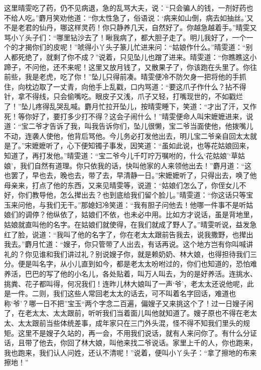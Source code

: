 \documentclass[12pt,oneside]{book}
\begin{document}
这里晴雯吃了药，仍不见病退，急的乱骂大夫，说：“只会骗人的钱，一剂好药也不给人吃。”麝月笑劝他道：“你太性急了，俗语说：‘病来如山倒，病去如抽丝。’又不是老君的仙丹，哪这样灵药！你只静养几天，自然好了。你越急越着手。”晴雯又骂小丫头子们：“哪里钻沙去了！瞅我病了，都大胆子走了。明儿我好了，一个一个的才揭你们的皮呢！”唬得小丫头子篆儿忙进来问：“姑娘作什么。”晴雯道：“别人都死绝了，就剩了你不成？”说着，只见坠儿也蹭了进来。晴雯道：“你瞧瞧这小蹄子，不问他，还不来呢！这里又放月钱了，又散果子了，你该跑在头里了。你往前些，我是老虎，吃了你！”坠儿只得前凑。晴雯便冷不防欠身一把将他的手抓住，向枕边取了一丈青，向他手上乱戳，口内骂道：“要这爪子作什么？拈不得针，拿不得线，只会偷嘴吃。眼皮子又浅，爪子又轻，打嘴现世的，不如戳烂了！”坠儿疼得乱哭乱喊。麝月忙拉开坠儿，按晴雯睡下，笑道：“才出了汗，又作死！等你好了，要打多少打不得？这会子闹什么！”晴雯便命人叫宋嬷嬷进来，说道：“宝二爷才告诉了我，叫我告诉你们，坠儿很懒，宝二爷当面使他，他拨嘴儿不动，连袭人使他，他背后骂他。今儿务必打发他出去，明儿宝二爷亲自回太太就是了。”宋嬷嬷听了，心下便知镯子事发，因笑道：“虽如此说，也等花姑娘回来，知道了，再打发他。”晴雯道：“宝二爷今儿千叮咛万嘱咐的，什么‘花姑娘’‘草姑娘’，我们自然有道理。你只依我的话，快叫他家的人来领他出去！”麝月道：“这也罢了，早也去，晚也去，带了去，早清静一日。”宋嬷嬷听了，只得出去，唤了他母亲来，打点了他的东西，又来见晴雯等，说道：“姑娘们怎么了，你侄女儿不好，你们教导他，怎么撵出去？也到底给我们留个脸儿。”晴雯道：“你这话只等宝玉来问他，与我们无干。”那媳妇冷笑道：“我有胆子问他去！他哪一件事不是听姑娘们的调停？他纵依了，姑娘们不依，也未必中用。比如方才说话，虽是背地里，姑娘就直叫他的名字。在姑娘们就使得，在我们就成了野人了。”晴雯听说，益发急红了脸，说道：“我叫了他的名字了，你在老太太跟前告我去，说我撒野，也撵出我去。”麝月忙道：“嫂子，你只管带了人出去，有话再说。这个地方岂有你叫喊讲礼的？你见谁和我们讲过礼？别说嫂子你，就是赖奶奶、林大娘，也得担待我们三分。便是叫名字，从小儿直到如今，都是老太太吩咐过的，你们也知道的，恐怕难养活，巴巴的写了他的小名儿，各处贴着，叫万人叫去，为的是好养活。连挑水、挑粪、花子都叫得，何况我们！连昨儿林大娘叫了一声‘爷’，老太太还说他呢，此是一件。二则，我们这些人常回老太太的话去，可不叫着名字回话，难道也称‘爷’？哪一日不把”宝玉“两个字念二百遍，偏嫂子又来挑这个了！过一日嫂子闲了，在老太太、太太跟前，听听我们当着面儿叫他就知道了。嫂子原也不得在老太太、太太跟前当些体统差事，成年家只在三门外头混，怪不得不知我们里头的规矩。这里不是嫂子久站的，再一会，不用我们说话，就有人来问你了。有什么分证话，且带了他去，你回了林大娘，叫他来找二爷说话。家里上千的人，你也跑来，我也跑来，我们认人问姓，还认不清呢！”说着，便叫小丫头子：“拿了擦地的布来擦地！”
\end{document}
